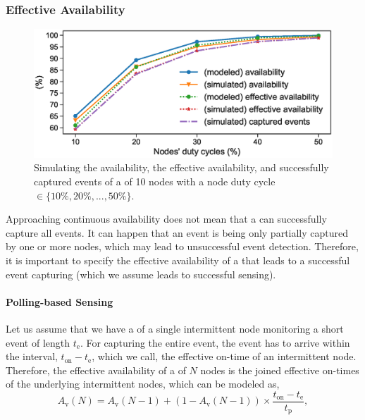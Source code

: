 \subsubsection{Effective Availability}
%
\begin{figure}
		\centering
		\includegraphics[width=\columnwidth]{figures/effective_availability_2}
		\caption{Simulating the availability, the effective availability, and successfully captured events of a \cis of 10 nodes with a node duty cycle $\in \{10\%, 20\%,...,50\%\}$.}
		\label{fig:cis_simulation}
\end{figure}
%
Approaching continuous availability does not mean that a \cis can successfully capture all events. It can happen that an event is being only partially captured by one or more nodes, which may lead to unsuccessful event detection. Therefore, it is important to specify the effective availability of a \cis that leads to a successful event capturing (which we assume leads to successful sensing). 

\paragraph{Polling-based Sensing}
Let us assume that we have a \cis of a single intermittent node monitoring a short event of length $t_\text{e}$. For capturing the entire event, the event has to arrive within the interval, $t_\text{on} - t_\text{e}$, which we call, the effective on-time of an intermittent node.
Therefore, the effective availability of a \cis of $N$ nodes is the joined effective on-times of the underlying intermittent nodes, which can be modeled as,
%
\begin{equation}
		A_\text{v}(N) = A_\text{v}(N-1) + \left(1-A_\text{v}(N-1)\right) \times \frac{t_\text{on} - t_\text{e}}{t_\text{p}},
		\label{eq:cisSenseModel}
\end{equation} 
%
